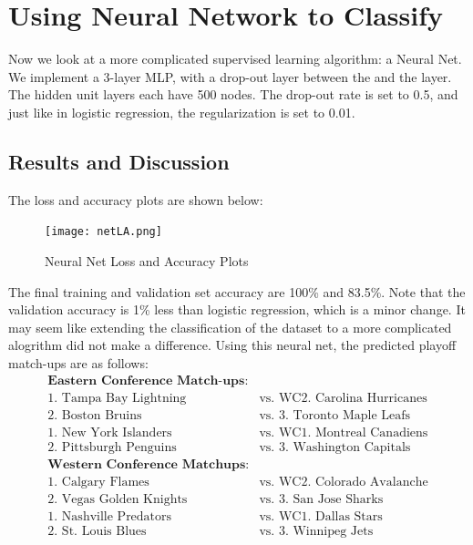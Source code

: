 \documentclass[10pt,letterpaper]{article}
\begin{document}
\section*{Using Neural Network to Classify}
Now we look at a more complicated supervised learning algorithm: a Neural Net. We implement a 3-layer MLP, with a drop-out layer between the  and the  layer. The hidden unit layers each have 500 nodes. The drop-out rate is set to 0.5, and just like in logistic regression, the regularization is set to 0.01.
\subsection*{Results and Discussion}
The loss and accuracy plots are shown below:
\begin{figure}[H]
 	\centering
    \texttt{[image: netLA.png]}
    \caption{Neural Net Loss and Accuracy Plots}
    \label{fig:Neural}
\end{figure}

The final training and validation set accuracy are 100\% and 83.5\%. Note that the validation accuracy is 1\% less than logistic regression, which is a minor change. It may seem like extending the classification of the dataset to a more complicated alogrithm did not make a difference. Using this neural net, the predicted playoff match-ups are as follows:
\begin{align*}
    \textbf{Eastern Conference Match-ups:}\\
    \text{1. Tampa Bay Lightning } &\text{vs. } \text{WC2. Carolina Hurricanes}\\
    \text{2. Boston Bruins } &\text{vs. } \text{3. Toronto Maple Leafs}\\
    \text{1. New York Islanders } &\text{vs. } \text{WC1. Montreal Canadiens}\\
    \text{2. Pittsburgh Penguins } &\text{vs. } \text{3. Washington Capitals}\\
    \textbf{Western Conference Matchups:}\\
    \text{1. Calgary Flames } &\text{vs. } \text{WC2. Colorado Avalanche}\\
    \text{2. Vegas Golden Knights } &\text{vs. } \text{3. San Jose Sharks}\\
    \text{1. Nashville Predators } &\text{vs. } \text{WC1. Dallas Stars}\\
    \text{2. St. Louis Blues } &\text{vs. } \text{3. Winnipeg Jets}
\end{align*}
\end{document}
